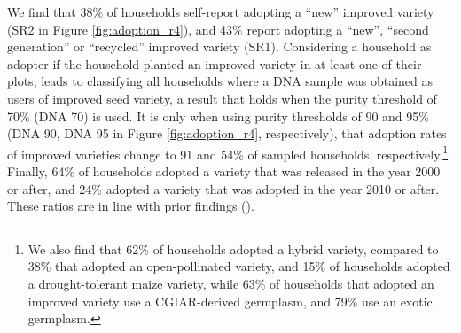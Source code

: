 \documentclass[11pt]{article}
\begin{document}
We find that 38\% of households self-report adopting a “new” improved variety (SR2 in Figure \ref{fig:adoption_r4}), and 43\% report adopting a “new”, “second generation” or “recycled” improved variety (SR1). Considering a household as adopter if the household planted an improved variety in at least one of their plots, leads to classifying all households where a DNA sample was obtained as users of improved seed variety, a result that holds when the purity threshold of 70\% (DNA 70) is used. It is only when using purity thresholds of 90 and 95\% (DNA 90, DNA 95 in Figure \ref{fig:adoption_r4}, respectively), that adoption rates of improved varieties change to 91 and 54\% of sampled households, respectively.\footnote{We also find that 62\% of households adopted a hybrid variety, compared to 38\% that adopted an open-pollinated variety, and 15\% of households adopted a drought-tolerant maize variety, while 63\% of households that adopted an improved variety use a CGIAR-derived germplasm, and 79\% use an exotic germplasm.} Finally, 64\% of households adopted a variety that was released in the year 2000 or after, and 24\% adopted a variety that was adopted in the year 2010 or after. These ratios are in line with prior findings (\cite{Zeng15}).
\end{document}
